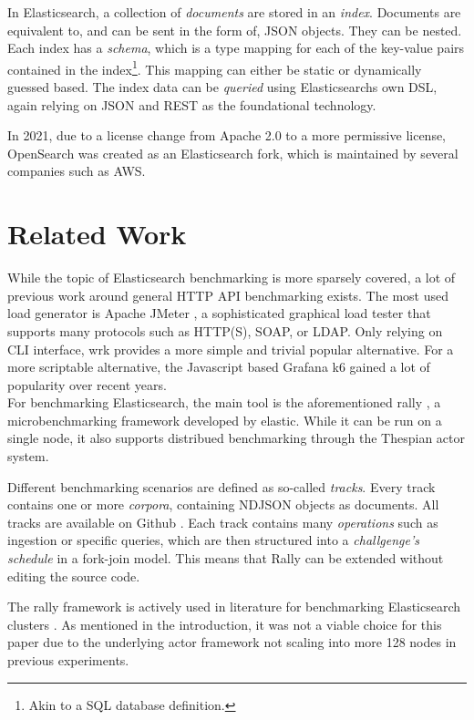 In Elasticsearch, a collection of \emph{documents} are stored in an \emph{index}. Documents are equivalent to, and can be sent in the form of, \ac{JSON} objects. They can be nested. Each index has a \emph{schema}, which is a type mapping for each of the key-value pairs contained in the index\footnote{Akin to a SQL database definition.}. This mapping can either be static or dynamically guessed based. The index data can be \emph{queried} using Elasticsearchs own \ac{DSL}, again relying on \ac{JSON} and REST as the foundational technology.

In 2021, due to a license change from Apache 2.0 to a more permissive license, OpenSearch was created as an Elasticsearch fork, which is maintained by several companies such as AWS.

\section{Related Work}
While the topic of Elasticsearch benchmarking is more sparsely covered, a lot of previous work around general HTTP API benchmarking exists. The most used load generator is Apache JMeter \cite{jmeter}, a sophisticated graphical load tester that supports many protocols such as HTTP(S), SOAP, or LDAP. Only relying on \ac{CLI} interface, wrk \cite{wrk} provides a more simple and trivial popular alternative. For a more scriptable alternative, the Javascript based Grafana k6 \cite{k6} gained a lot of popularity over recent years.\\

For benchmarking Elasticsearch, the main tool is the aforementioned rally \cite{rally}, a microbenchmarking framework developed by elastic. While it can be run on a single node, it also supports distribued benchmarking through the Thespian actor system.

Different benchmarking scenarios are defined as so-called \emph{tracks}. Every track contains one or more \emph{corpora}, containing \ac{NDJSON} objects as documents. All tracks are available on Github \cite{rallytracks}. Each track contains many \emph{operations} such as ingestion or specific queries, which are then structured into a \emph{challgenge's} \emph{schedule} in a fork-join model. This means that Rally can be extended without editing the source code.

The rally framework is actively used in literature for benchmarking Elasticsearch clusters \cite{rallyusecase1} \cite{rallyusecase2} \cite{rallyusecase3}. As mentioned in the introduction, it was not a viable choice for this paper due to the underlying actor framework not scaling into more 128 nodes in previous experiments.\\

